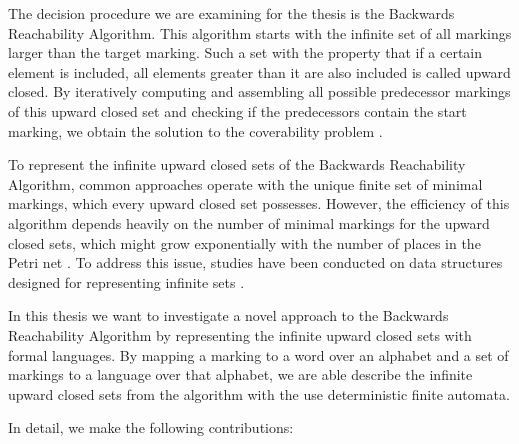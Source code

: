 The decision procedure we are examining for the thesis is the Backwards Reachability Algorithm. This algorithm starts with the infinite set of all markings larger than the target marking. Such a set with the property that if a certain element is included, all elements greater than it are also included is called upward closed. By iteratively computing and assembling all possible predecessor markings of this upward closed set and checking if the predecessors contain the start marking, we obtain the solution to the coverability problem \cite{abdulla_96}. 

To represent the infinite upward closed sets of the Backwards Reachability Algorithm, common approaches operate with the unique finite set of minimal markings, which every upward closed set possesses. However, the efficiency of this algorithm depends heavily on the number of minimal markings for the upward closed sets, which might grow exponentially with the number of places in the Petri net \cite{delzanno_00}. To address this issue, studies have been conducted on data structures designed for representing infinite sets \cite{wolper_98, moller_99, delzanno_04}.

%



In this thesis we want to investigate a novel approach to the Backwards Reachability Algorithm by representing the infinite upward closed sets with formal languages.
By mapping a marking to a word over an alphabet and a set of markings to a language over that alphabet, we are able describe the infinite upward closed sets from the algorithm with the use deterministic finite automata.
 
In detail, we make the following contributions:

